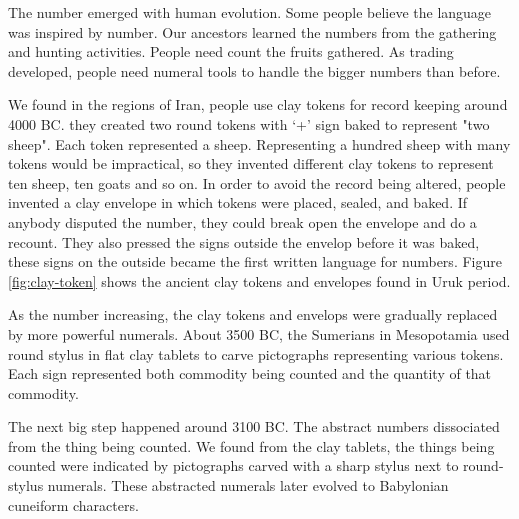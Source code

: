 \documentclass[UTF8]{article}
\begin{document}
The number emerged with human evolution. Some people believe the language was inspired by number. Our ancestors learned the numbers from the gathering and hunting activities. People need count the fruits gathered. As trading developed, people need numeral tools to handle the bigger numbers than before.

We found in the regions of Iran, people use clay tokens for record keeping around 4000 BC. they created two round tokens with `+' sign baked to represent "two sheep". Each token represented a sheep. Representing a hundred sheep with many tokens would be impractical, so they invented different clay tokens to represent ten sheep, ten goats and so on. In order to avoid the record being altered, people invented a clay envelope in which tokens were placed, sealed, and baked. If anybody disputed the number, they could break open the envelope and do a recount. They also pressed the signs outside the envelop before it was baked, these signs on the outside became the first written language for numbers\cite{Calvin-Clawson-1994}. Figure \ref{fig:clay-token} shows the ancient clay tokens and envelopes found in Uruk period.

As the number increasing, the clay tokens and envelops were gradually replaced by more powerful numerals. About 3500 BC, the Sumerians in Mesopotamia used round stylus in flat clay tablets to carve pictographs representing various tokens. Each sign represented both commodity being counted and the quantity of that commodity.

The next big step happened around 3100 BC. The abstract numbers dissociated from the thing being counted. We found from the clay tablets, the things being counted were indicated by pictographs carved with a sharp stylus next to round-stylus numerals. These abstracted numerals later evolved to Babylonian cuneiform characters.
\end{document}
